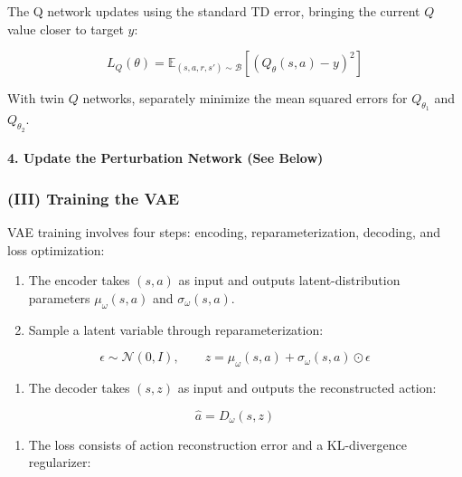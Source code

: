 The Q network updates using the standard TD error, bringing the current \(Q\) value closer to target \(y\):

\[
L_Q(\theta)=\mathbb{E}_{(s,a,r,s')\sim\mathcal B}
[(Q_\theta(s,a)-y)^{2}]
\]

With twin \(Q\) networks, separately minimize the mean squared errors for \(Q_{\theta_1}\) and \(Q_{\theta_2}\).

\hypertarget{update-the-perturbation-network-see-below}{%
\paragraph{4. Update the Perturbation Network (See Below)}\label{update-the-perturbation-network-see-below}}

\hypertarget{iii-training-the-vae}{%
\subsubsection{(III) Training the VAE}\label{iii-training-the-vae}}

VAE training involves four steps: encoding, reparameterization, decoding, and loss optimization:

\begin{enumerate}
\def\labelenumi{\arabic{enumi}.}
\tightlist
\item
  The encoder takes \((s,a)\) as input and outputs latent-distribution parameters \(\mu_\omega(s,a)\) and \(\sigma_\omega(s,a)\).
\item
{}
  Sample a latent variable through reparameterization:
\end{enumerate}

\[
\epsilon \sim \mathcal{N}(0,I), \qquad z=\mu_\omega(s,a)+\sigma_\omega(s,a)\odot\epsilon
\]

\begin{enumerate}
\def\labelenumi{\arabic{enumi}.}
\setcounter{enumi}{2}
\tightlist
\item
{}
  The decoder takes \((s,z)\) as input and outputs the reconstructed action:
\end{enumerate}

\[
\hat a = D_\omega(s,z)
\]

\begin{enumerate}
\def\labelenumi{\arabic{enumi}.}
\setcounter{enumi}{3}
\tightlist
\item
{}
  The loss consists of action reconstruction error and a KL-divergence regularizer:
\end{enumerate}

